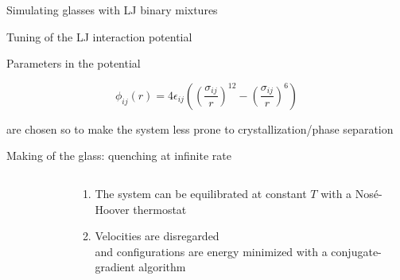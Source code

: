 \documentclass[compress]{beamer}
\begin{document}
	\begin{frame}{Simulating glasses with LJ binary mixtures}
		
		
		\begin{block}{Tuning of the LJ interaction potential}
	
			Parameters in the potential
			
			\begin{equation*}
				\phi_{ij}(r) = 4\epsilon_{ij} \left(\left(\frac{\sigma_{ij}}{r}\right)^{12} - \left(\frac{\sigma_{ij}}{r}\right)^{6}\right)
			\end{equation*}
	
			are chosen so to make the system less prone to crystallization/phase separation
	
		\end{block}
		
		
		\begin{block}{Making of the glass: quenching at infinite rate}
	
	
			\begin{columns}[c]
				
				\begin{column}{0.25\textwidth}
					\centering
					\begin{figure}
					\end{figure}
				\end{column}
			
				\begin{column}{0.75\textwidth}
				
					\begin{enumerate} 
						\item<4-> The system can be equilibrated at constant $T$ with a Nos\'e-Hoover thermostat
						\item<5-> Velocities are disregarded \\ \onslide<6->  and configurations are energy minimized with a conjugate-gradient algorithm
					\end{enumerate}
				
				\end{column}
				
			\end{columns}
	
		\end{block}		
		
	\end{frame}	
\end{document}
